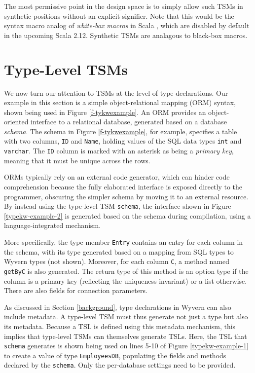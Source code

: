 \documentclass{sig-alternate}
\begin{document}
The most permissive point in the design space is to simply allow such TSMs in synthetic positions without an explicit signifier. Note that this would be the syntax macro analog of \emph{white-box  macros} in Scala \cite{ScalaMacros2013}, which are disabled by default in the upcoming Scala 2.12. Synthetic TSMs are analagous to black-box macros. 

\section{Type-Level TSM\lowercase{s}}\label{tsms-type}
We now turn our attention to TSMs at the level of type declarations. Our example in this section is a simple object-relational mapping (ORM) syntax, shown being used in Figure \ref{f-tykwexample}. An ORM provides an object-oriented interface to a relational database, generated based on a database \emph{schema}. The schema in Figure \ref{f-tykwexample}, for example, specifies a table with two columns, \verb|ID| and \verb|Name|, holding values of the SQL data types \verb|int| and \verb|varchar|. The \verb|ID| column is marked with an asterisk as being a \emph{primary key}, meaning that it must be unique across the rows. 

ORMs typically rely on an external code generator, which can hinder code comprehension because the fully elaborated interface is exposed directly to the programmer, obscuring the simpler schema by moving it to an external resource. By instead using the type-level TSM \verb|schema|, the interface shown in Figure \ref{typekw-example-2} is generated based on the schema during compilation, using a language-integrated mechanism. 

More specifically, the type member \verb|Entry| contains an entry for each column in the schema, with its type generated based on a mapping from SQL types to Wyvern types (not shown). Moreover, for each column \verb|C|, a method named \verb|getByC| is also generated. The return type of this method is an option type if the column is a primary key (reflecting the uniqueness invariant) or a list otherwise. There are also fields for connection parameters. 

As discussed in Section \ref{background}, type declarations in Wyvern can also include metadata. A type-level TSM must thus generate not just a type but also its metadata. Because a TSL is defined using this metadata mechanism, this implies that type-level TSMs can themselves generate TSLs. Here, the TSL that \verb|schema| generates is shown being used on lines 5-10 of Figure \ref{typekw-example-1} to create a value of type \verb|EmployeesDB|, populating the fields and methods declared by the \verb|schema|. Only the per-database settings need to be provided. %
\end{document}
